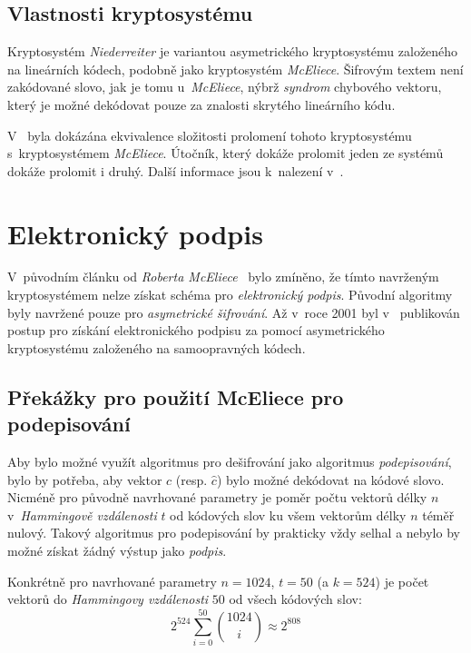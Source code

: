 \documentclass[thesis=M,czech,hidelinks]{FITthesis}[2012/06/26]
\newcommand{\0}{{\textcolor[gray]{0.80}{0}}}
\begin{document}
\subsection{Vlastnosti kryptosystému}

Kryptosystém \emph{Niederreiter} je variantou asymetrického kryptosystému
založeného na lineárních kódech, podobně jako kryptosystém \emph{McEliece}.
Šifrovým textem není zakódované slovo, jak je tomu u~\emph{McEliece}, nýbrž
\emph{syndrom} chybového vektoru, který je možné dekódovat pouze za znalosti
skrytého lineárního kódu.

V~\cite{XingLi} byla dokázána ekvivalence složitosti prolomení tohoto
kryptosystému s~kryptosystémem \emph{McEliece}. Útočník, který dokáže prolomit
jeden ze systémů dokáže prolomit i druhý. Další informace jsou k~nalezení
v~\cite{Niederreiter,Courtois}.



\section{Elektronický podpis}

V~původním článku od \emph{Roberta McEliece}~\cite{McEliece} bylo zmíněno, že
tímto navrženým kryptosystémem nelze získat schéma pro \emph{elektronický
podpis}.  Původní algoritmy byly navržené pouze pro \emph{asymetrické
šifrování}. Až v~roce 2001 byl v~\cite{Courtois} publikován postup pro získání
elektronického podpisu za pomocí asymetrického kryptosystému založeného na
samoopravných kódech.

\subsection{Překážky pro použití McEliece pro podepisování}

Aby bylo možné využít algoritmus pro dešifrování jako algoritmus
\emph{podepisování}, bylo by potřeba, aby vektor $c$ (resp. $\hat{c}$) bylo
možné dekódovat na kódové slovo. Nicméně pro původně navrhované parametry je
poměr počtu vektorů délky $n$ v~\emph{Hammingově vzdálenosti} $t$ od kódových
slov ku všem vektorům délky $n$ téměř nulový. Takový algoritmus pro podepisování
by prakticky vždy selhal a nebylo by možné získat žádný výstup jako
\emph{podpis}.

Konkrétně pro navrhované parametry $n=1024$, $t=50$ (a $k=524$) je počet vektorů
do \emph{Hammingovy vzdálenosti} $50$ od všech kódových slov:
$$ 2^{524}\sum_{i = 0}^{50}\binom{1024}{i} \approx 2^{808} $$
\end{document}
